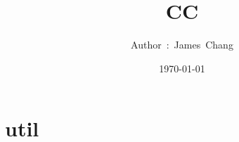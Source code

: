 

\title{CC}
\author{ {\Biohazard} \hspace{1.5mm} \hspace{1.5mm} Author\ :\ James\ Chang}
\date{\today}


\large

\tableofcontents

\chapter{util}












